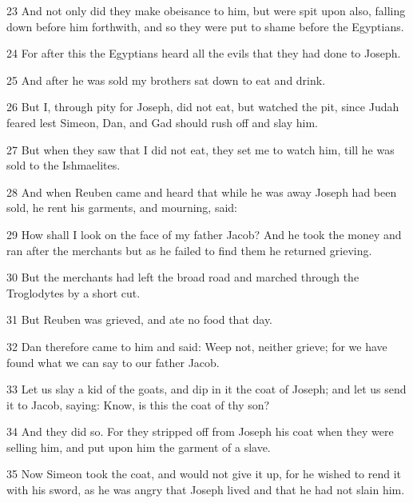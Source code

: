 \par 23 And not only did they make obeisance to him, but were spit upon also, falling down before him forthwith, and so they were put to shame before the Egyptians.

\par 24 For after this the Egyptians heard all the evils that they had done to Joseph.

\par 25 And after he was sold my brothers sat down to eat and drink.

\par 26 But I, through pity for Joseph, did not eat, but watched the pit, since Judah feared lest Simeon, Dan, and Gad should rush off and slay him.

\par 27 But when they saw that I did not eat, they set me to watch him, till he was sold to the Ishmaelites.

\par 28 And when Reuben came and heard that while he was away Joseph had been sold, he rent his garments, and mourning, said:

\par 29 How shall I look on the face of my father Jacob? And he took the money and ran after the merchants but as he failed to find them he returned grieving.

\par 30 But the merchants had left the broad road and marched through the Troglodytes by a short cut.

\par 31 But Reuben was grieved, and ate no food that day.

\par 32 Dan therefore came to him and said: Weep not, neither grieve; for we have found what we can say to our father Jacob.

\par 33 Let us slay a kid of the goats, and dip in it the coat of Joseph; and let us send it to Jacob, saying: Know, is this the coat of thy son?

\par 34 And they did so. For they stripped off from Joseph his coat when they were selling him, and put upon him the garment of a slave.

\par 35 Now Simeon took the coat, and would not give it up, for he wished to rend it with his sword, as he was angry that Joseph lived and that he had not slain him.

